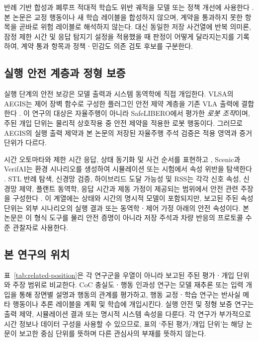 반례 기반 합성과 폐루프 적대적 학습도 위반 궤적을 모델 또는 정책 개선에 사용한다 \cite{ghosh2020counterexample,zhang2023cat}. 본 논문은 교정 행동이나 새 학습 레이블을 합성하지 않으며, 계약을 통과하지 못한 항목을 곧바로 위험 레이블로 해석하지 않는다. 대신 동일한 저장 사건열에 반복 의미론, 잠정 제한 시간 및 응답 탐지기 설정을 적용했을 때 판정이 어떻게 달라지는지를 기록하여, 계약 통과 항목과 정책ㆍ민감도 의존 검토 후보를 구분한다.

\subsection{실행 안전 계층과 정형 보증}
실행 단계의 안전 보강은 모델 출력과 시스템 동역학에 직접 개입한다. VLSA의 AEGIS는 제어 장벽 함수로 구성한 플러그인 안전 제약 계층을 기존 VLA 출력에 결합한다 \cite{hu2025vlsa}. 이 연구의 대상은 자율주행이 아니라 SafeLIBERO에서 평가한 \emph{로봇 조작}이며, 주된 개입 단위는 물리적 상호작용 중 안전 제약을 적용한 로봇 행동이다. 그러므로 AEGIS의 실행 출력 제약과 본 논문의 저장된 자율주행 주석 검증은 적용 영역과 증거 단위가 다르다.

시간 오토마타와  제한 시간 응답, 상태 동기화 및 사건 순서를 표현하고 \cite{behrmann2004uppaal}, Scenic과 VerifAI는 환경 시나리오를 생성하여 시뮬레이션 또는 시험에서 속성 위반을 탐색한다 \cite{fremont2019scenic,dreossi2019verifai,fremont2020formal}. STL 반례 탐색, 신경망 검증, 하이브리드 도달 가능성 및 RSS는 각각 신호 속성, 신경망 제약, 플랜트 동역학, 응답 시간과 제동 가정이 제공되는 범위에서 안전 관련 주장을 구성한다 \cite{donze2010robustness,katz2019marabou,ivanov2019verisig,shalev2017rss}. 이 계열에는 상태와 시간의 명시적 모델이 포함되지만, 보고된 주된 속성 단위는 외부 시나리오의 실행 결과 또는 동역학ㆍ제어 가정 아래의 안전 속성이다. 본 논문은 이 형식 도구를 물리 안전 증명이 아니라 저장 주석과 차량 반응의 프로토콜 수준 관찰자로 사용한다.

\subsection{본 연구의 위치}
표~\ref{tab:related-position}은 각 연구군을 우열이 아니라 보고된 주된 평가ㆍ개입 단위와 주장 범위로 비교한다. CoC 충실도ㆍ행동 인과성 연구는 모델 재추론 또는 입력 개입을 통해 장면별 설명과 행동의 관계를 평가하고, 행동 교정ㆍ학습 연구는 반사실 메타 행동이나 추론 레이블을 계획 및 학습에 개입시킨다. 실행 안전 및 정형 보증 연구는 출력 제약, 시뮬레이션 결과 또는 명시적 시스템 속성을 다룬다. 각 연구가 부가적으로 시간 정보나 데이터 구성을 사용할 수 있으므로, 표의 `주된 평가/개입 단위'는 해당 논문이 보고한 중심 단위를 뜻하며 다른 관심사의 부재를 뜻하지 않는다.

